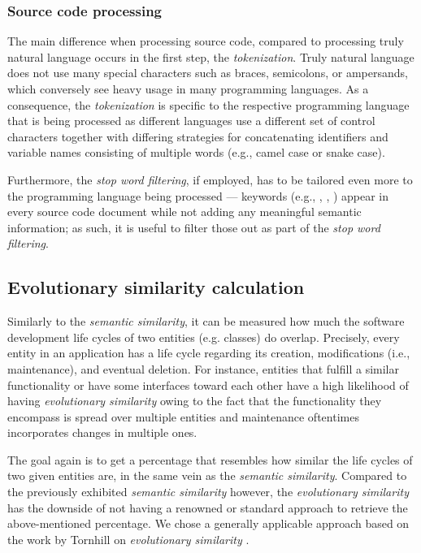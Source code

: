 \documentclass[12pt,a4paper]{report}
\begin{document}
\subsubsection{Source code processing}
The main difference when processing source code, compared to processing
truly natural language occurs in the first step, the \textit{tokenization}.
Truly natural language does not use many special characters such as braces,
semicolons, or ampersands, which conversely see heavy usage in
many programming languages.
As a consequence, the \textit{tokenization} is specific to the respective
programming language that is being processed as different languages use a
different set of control characters together with differing strategies for
concatenating identifiers and variable names consisting of multiple words
(e.g., camel case or snake case).

Furthermore, the \textit{stop word filtering}, if employed, has to be tailored
even more to the programming language being processed --- keywords (e.g.,
, , ) appear in every source code document
while not adding any meaningful semantic information; as such, it is useful to
filter those out as part of the \textit{stop word filtering}.


\subsection{Evolutionary similarity calculation} \label{subsect:evolutionary-similarity}

Similarly to the \textit{semantic similarity}, it can be measured how much the
software development life cycles of two entities (e.g. classes) do overlap.
Precisely, every entity in an application has a life cycle regarding its
creation, modifications (i.e., maintenance), and eventual deletion. For
instance, entities that fulfill a similar functionality or have some interfaces
toward each other have a high likelihood of having \textit{evolutionary
similarity} owing to the fact that the functionality they encompass is spread
over multiple entities and maintenance oftentimes incorporates changes in
multiple ones.

The goal again is to get a percentage that resembles how similar the life
cycles of two given entities are, in the same vein as the \textit{semantic
similarity}. Compared to the previously exhibited \textit{semantic similarity}
however, the \textit{evolutionary similarity} has the downside of not having a
renowned or standard approach to retrieve the above-mentioned percentage. We
chose a generally applicable approach based on the work by Tornhill on \textit{
evolutionary similarity} \cite{tornhill2015crimescene}.
\end{document}
